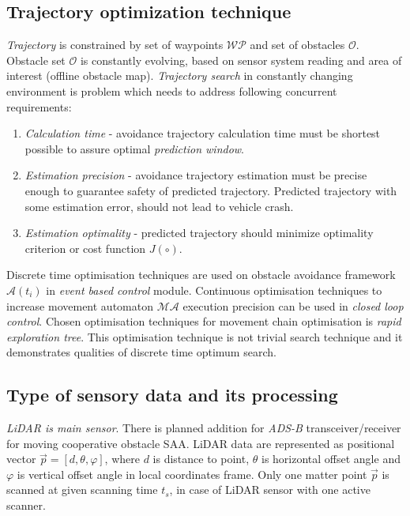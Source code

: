 \subsection*{Trajectory optimization technique}
\noindent \textit{Trajectory} is constrained by set of waypoints $\mathscr{WP}$ and set of obstacles $\mathscr{O}$. Obstacle set $\mathscr{O}$ is constantly evolving, based on sensor system reading and area of interest (offline obstacle map). \textit{Trajectory search} in constantly changing environment is problem which needs to address following concurrent requirements:
\begin{enumerate}
    \item \textit{Calculation time} - avoidance trajectory calculation time must be shortest possible to assure optimal \textit{prediction window}.
    \item \textit{Estimation precision} - avoidance trajectory estimation must be precise enough to guarantee safety of predicted trajectory. Predicted trajectory with some estimation error, should not lead to vehicle crash. 
    \item \textit{Estimation optimality} - predicted trajectory should minimize optimality criterion or cost function $J(\circ)$.
\end{enumerate}
\noindent Discrete time optimisation techniques are used on obstacle avoidance framework $\mathscr{A}(t_i)$ in \textit{event based control} module.  Continuous optimisation techniques to increase movement automaton $\mathscr{MA}$ execution precision can be used in \textit{closed loop control}. Chosen optimisation techniques for movement chain optimisation is \textit{rapid exploration tree}. This optimisation technique is not trivial search technique and it demonstrates qualities of discrete time optimum search.

\subsection*{Type of sensory data and its processing}
\noindent \textit{LiDAR is main sensor}. There is planned addition for \textit{ADS-B} transceiver/receiver for moving cooperative obstacle SAA. LiDAR data are represented as positional vector $\vec{p}=[d,\theta,\varphi]$, where $d$ is distance to point, $\theta$ is horizontal offset angle and $\varphi$ is vertical offset angle in local coordinates frame. Only one matter point $\vec{p}$ is scanned at given scanning time $t_s$, in case of LiDAR sensor with one active scanner. 

